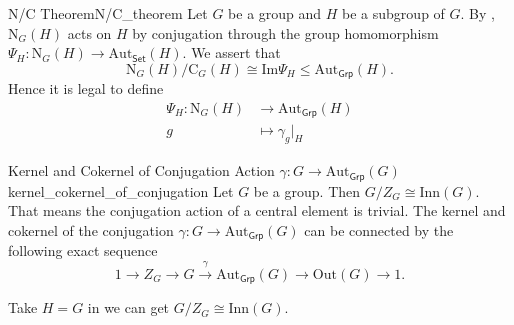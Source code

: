 
\begin{theorem}{N/C Theorem}{N/C_theorem}
    Let $G$ be a group and $H$ be a subgroup of $G$. By , $\mathrm{N}_G(H)$ acts on $H$ by conjugation through the group homomorphism $\Psi_H:\mathrm{N}_G(H)\to \mathrm{Aut}_{\mathsf{Set}}(H)$. We assert that
    \[
        \mathrm{N}_G(H)/\mathrm{C}_G(H) \cong \mathrm{Im}\Psi_H\le \mathrm{Aut}_{\mathsf{Grp}}(H).
    \]
    Hence it is legal to define
    \begin{align*}
        \Psi_H: \mathrm{N}_G(H) & \longrightarrow \mathrm{Aut}_{\mathsf{Grp}}(H) \\
        g                       & \longmapsto \gamma_g|_H
    \end{align*}
\end{theorem}

\begin{corollary}{Kernel and Cokernel of Conjugation Action $\gamma:G\to \mathrm{Aut}_{\mathsf{Grp}}(G)$}{kernel_cokernel_of_conjugation}
    Let $G$ be a group. Then $G/Z_G\cong \mathrm{Inn}(G)$. That means the conjugation action of a central element is trivial. The kernel and cokernel of the conjugation $\gamma:G\to \mathrm{Aut}_{\mathsf{Grp}}(G)$ can be connected by the following exact sequence
    \[
        1\longrightarrow Z_G\longrightarrow G\xrightarrow{\hspace{5pt}\gamma\hspace{5pt}}\mathrm{Aut}_{\mathsf{Grp}}(G)\longrightarrow \mathrm{Out}(G)\longrightarrow 1.
    \]
\end{corollary}

\begin{prf}
    Take $H=G$ in  we can get $G/Z_G\cong \mathrm{Inn}(G)$.
\end{prf}





